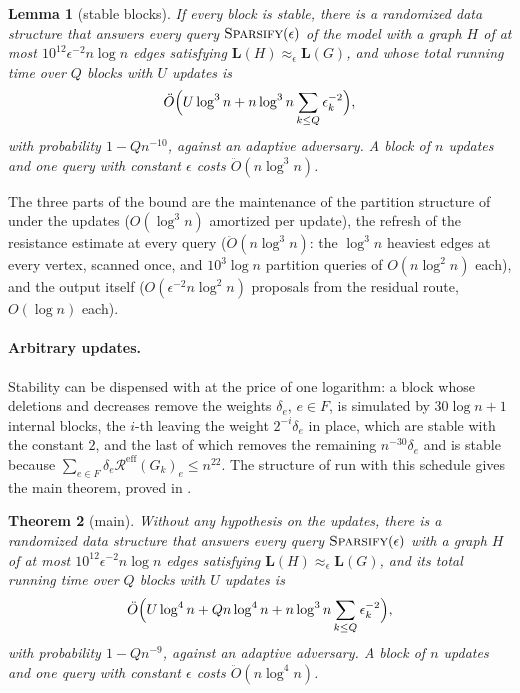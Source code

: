 \documentclass[11pt]{article}
\newtheorem{theorem}{Theorem}[section]
\newtheorem{lemma}[theorem]{Lemma}
\theoremstyle{remark}
\newcommand{\LL}{\mathbf L}
\newcommand{\Rcal}{\mathcal{R}}
\newcommand{\Reff}{\Rcal^{\mathrm{eff}}}
\newcommand{\Odouble}{\ddot{O}}
\begin{document}
\begin{lemma}[stable blocks]\label{lem:stable}
If every block is stable, there is a randomized data structure that answers
every query $\textsc{Sparsify}(\epsilon)$ of the model with a graph $H$ of at
most $10^{12}\epsilon^{-2}n\log n$ edges satisfying $\LL(H)\approx_{\epsilon}\LL(G)$,
and whose total running time over $Q$ blocks with $U$ updates is
\[
\Odouble\Bigl(U\log^{3}n+n\log^{3}n\sum_{k\le Q}\epsilon_k^{-2}\Bigr),
\]
with probability $1-Qn^{-10}$, against an adaptive adversary.
A block of $n$ updates and one query with constant $\epsilon$ costs
$\Odouble(n\log^{3}n)$.
\end{lemma}
The three parts of the bound are the maintenance of the partition structure
of  under the updates ($O(\log^{3}n)$ amortized per
update), the refresh of the resistance estimate at every query
($\Odouble(n\log^{3}n)$: the $\log^{3}n$ heaviest edges at every vertex,
scanned once, and $10^{3}\log n$ partition queries of $O(n\log^{2}n)$ each),
and the output itself ($O(\epsilon^{-2}n\log^{2}n)$ proposals from the
residual route, $O(\log n)$ each).

\paragraph{Arbitrary updates.}
Stability can be dispensed with at the price of one logarithm: a
block whose deletions and decreases remove the weights $\delta_e$, $e\in F$,
is simulated by $30\log n+1$ internal blocks, the $i$-th leaving the weight
$2^{-i}\delta_e$ in place, which are stable with the constant $2$, and the
last of which removes the remaining $n^{-30}\delta_e$ and is stable because
$\sum_{e\in F}\delta_e\Reff(G_k)_e\le n^{22}$.
The structure of  run with this schedule gives the main
theorem, proved in .
\begin{theorem}[main]\label{thm:main}
Without any hypothesis on the updates, there is a randomized data structure
that answers every query $\textsc{Sparsify}(\epsilon)$ with
a graph $H$ of at most $10^{12}\epsilon^{-2}n\log n$ edges satisfying
$\LL(H)\approx_{\epsilon}\LL(G)$, and its total running time over $Q$ blocks with
$U$ updates is
\[
\Odouble\Bigl(U\log^{4}n+Qn\log^{4}n+n\log^{3}n\sum_{k\le Q}\epsilon_k^{-2}\Bigr),
\]
with probability $1-Qn^{-9}$, against an adaptive adversary.
A block of $n$ updates and one query with constant $\epsilon$ costs
$\Odouble(n\log^{4}n)$.
\end{theorem}
\end{document}
